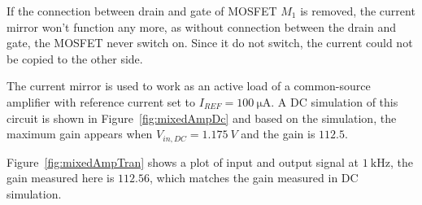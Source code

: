 \documentclass[12pt]{article}   %
\begin{document}
	If the connection between drain and gate of MOSFET $M_1$ is removed, the current mirror won't function any more, as without connection between the drain and gate, the MOSFET never switch on. Since it do not switch, the current could not be copied to the other side.
	
	The current mirror is used to work as an active load of a common-source amplifier with reference current set to $I_{REF} = \SI{100}{\micro\ampere}$. A DC simulation of this circuit is shown in Figure~\ref{fig:mixedAmpDc} and based on the simulation, the maximum gain appears when $V_{in,DC} = \SI{1.175}{V}$ and the gain is $112.5$.
	
	\begin{figure}[htbp]
		
	\end{figure}
	
	Figure~\ref{fig:mixedAmpTran} shows a plot of input and output signal at $\SI{1}{\kilo\hertz}$, the gain measured here is $112.56$, which matches the gain measured in DC simulation.
	
\end{document}
